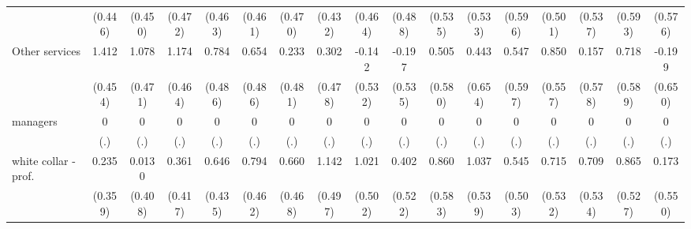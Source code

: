 {\begin{tabular}{l*{16}{c}}
                    &     (0.446)         &     (0.450)         &     (0.472)         &     (0.463)         &     (0.461)         &     (0.470)         &     (0.432)         &     (0.464)         &     (0.488)         &     (0.535)         &     (0.533)         &     (0.596)         &     (0.501)         &     (0.537)         &     (0.593)         &     (0.576)         \\
[1em]
Other services      &       1.412\sym{**} &       1.078\sym{*}  &       1.174\sym{*}  &       0.784         &       0.654         &       0.233         &       0.302         &      -0.142         &      -0.197         &       0.505         &       0.443         &       0.547         &       0.850         &       0.157         &       0.718         &      -0.199         \\
                    &     (0.454)         &     (0.471)         &     (0.464)         &     (0.486)         &     (0.486)         &     (0.481)         &     (0.478)         &     (0.532)         &     (0.535)         &     (0.580)         &     (0.654)         &     (0.597)         &     (0.557)         &     (0.578)         &     (0.589)         &     (0.650)         \\
[1em]
managers            &           0         &           0         &           0         &           0         &           0         &           0         &           0         &           0         &           0         &           0         &           0         &           0         &           0         &           0         &           0         &           0         \\
                    &         (.)         &         (.)         &         (.)         &         (.)         &         (.)         &         (.)         &         (.)         &         (.)         &         (.)         &         (.)         &         (.)         &         (.)         &         (.)         &         (.)         &         (.)         &         (.)         \\
[1em]
white collar - prof.&       0.235         &      0.0130         &       0.361         &       0.646         &       0.794         &       0.660         &       1.142\sym{*}  &       1.021\sym{*}  &       0.402         &       0.860         &       1.037         &       0.545         &       0.715         &       0.709         &       0.865         &       0.173         \\
                    &     (0.359)         &     (0.408)         &     (0.417)         &     (0.435)         &     (0.462)         &     (0.468)         &     (0.497)         &     (0.502)         &     (0.522)         &     (0.583)         &     (0.539)         &     (0.503)         &     (0.532)         &     (0.534)         &     (0.527)         &     (0.550)         \\

\end{tabular}}
